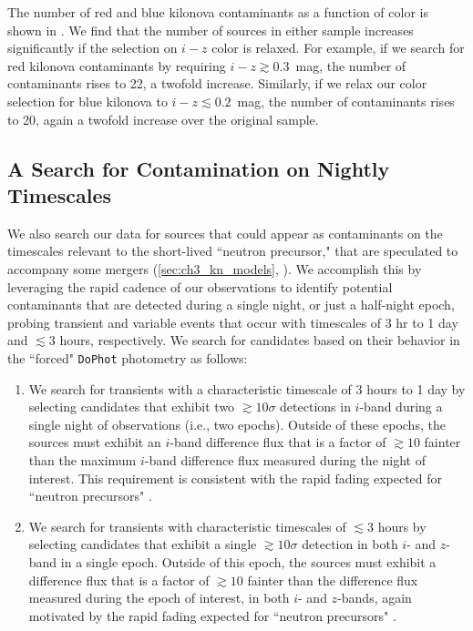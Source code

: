 The number of red and blue kilonova contaminants as a function of color is shown in . We find that the number of sources in either sample increases significantly if the selection on $i-z$ color is relaxed. For example, if we search for red kilonova contaminants by requiring $i-z \gtrsim 0.3$~mag, the number of contaminants rises to 22, a twofold increase. Similarly, if we relax our color selection for blue kilonova to $i-z \lesssim 0.2$~mag, the number of contaminants rises to 20, again a twofold increase over the original sample.

\clearpage
\subsection{A Search for Contamination on Nightly Timescales}
\label{sec:ch3_kn_short}
We also search our data for sources that could appear as contaminants on the timescales relevant to the short-lived ``neutron precursor," that are speculated to accompany some mergers (\cref{sec:ch3_kn_models}, \citealt{Metzger+15}). We accomplish this by leveraging the rapid cadence of our observations to identify potential contaminants that are detected during a single night, or just a half-night epoch, probing transient and variable events that occur with timescales of $3$ hr to 1 day and $\lesssim3$ hours, respectively. We search for candidates based on their behavior in the ``forced" {\tt DoPhot} photometry as follows:

\begin{enumerate}
\item We search for transients with a characteristic timescale of 3 hours to 1 day by selecting candidates that exhibit two $\gtrsim 10\sigma$ detections in $i$-band during a single night of observations (i.e., two epochs). Outside of these epochs, the sources must exhibit an $i$-band difference flux that is a factor of $\gtrsim 10$ fainter than the maximum $i$-band difference flux measured during the night of interest. This requirement is consistent with the rapid fading expected for ``neutron precursors" \citep{Metzger+15}.

\item We search for transients with characteristic timescales of $\lesssim 3$ hours by selecting candidates that exhibit a single $\gtrsim 10\sigma$ detection in both $i$- and $z$-band in a single epoch. Outside of this epoch, the sources must exhibit a difference flux that is a factor of $\gtrsim 10$ fainter than the difference flux measured during the epoch of interest, in both $i$- and $z$-bands, again motivated by the rapid fading expected for ``neutron precursors" \citep{Metzger+15}.
\end{enumerate}

